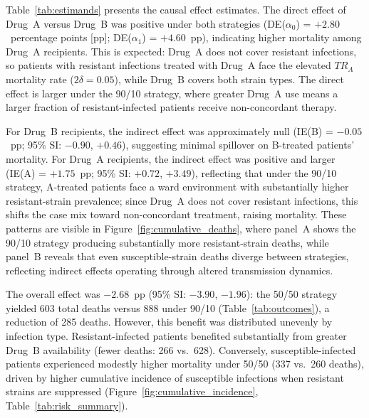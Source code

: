 \documentclass[12pt]{article}
\begin{document}
Table~\ref{tab:estimands} presents the causal effect estimates. The direct effect of Drug~A versus Drug~B was positive under both strategies (DE($\alpha_0$) = $+2.80$~percentage points [pp]; DE($\alpha_1$) = $+4.60$~pp), indicating higher mortality among Drug~A recipients. This is expected: Drug~A does not cover resistant infections, so patients with resistant infections treated with Drug~A face the elevated $TR_A$ mortality rate ($2\delta = 0.05$), while Drug~B covers both strain types. The direct effect is larger under the 90/10 strategy, where greater Drug~A use means a larger fraction of resistant-infected patients receive non-concordant therapy.

For Drug~B recipients, the indirect effect was approximately null (IE(B) = $-0.05$~pp; 95\% SI: $-0.90$, $+0.46$), suggesting minimal spillover on B-treated patients' mortality. For Drug~A recipients, the indirect effect was positive and larger (IE(A) = $+1.75$~pp; 95\% SI: $+0.72$, $+3.49$), reflecting that under the 90/10 strategy, A-treated patients face a ward environment with substantially higher resistant-strain prevalence; since Drug~A does not cover resistant infections, this shifts the case mix toward non-concordant treatment, raising mortality. These patterns are visible in Figure~\ref{fig:cumulative_deaths}, where panel~A shows the 90/10 strategy producing substantially more resistant-strain deaths, while panel~B reveals that even susceptible-strain deaths diverge between strategies, reflecting indirect effects operating through altered transmission dynamics.

The overall effect was $-2.68$~pp (95\% SI: $-3.90$, $-1.96$): the 50/50 strategy yielded 603 total deaths versus 888 under 90/10 (Table~\ref{tab:outcomes}), a reduction of 285 deaths. However, this benefit was distributed unevenly by infection type. Resistant-infected patients benefited substantially from greater Drug~B availability (fewer deaths: 266 vs.\ 628). Conversely, susceptible-infected patients experienced modestly higher mortality under 50/50 (337 vs.\ 260 deaths), driven by higher cumulative incidence of susceptible infections when resistant strains are suppressed (Figure~\ref{fig:cumulative_incidence}, Table~\ref{tab:risk_summary}).
\end{document}
